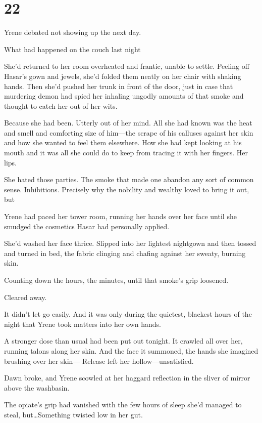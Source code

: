 
\chapter{22}

Yrene debated not showing up the next day.

What had happened on the couch last night 

She'd returned to her room overheated and frantic, unable to settle.
Peeling off Hasar's gown and jewels, she'd folded them neatly on her chair with shaking hands.
Then she'd pushed her trunk in front of the door, just in case that murdering demon had spied her inhaling ungodly amounts of that smoke and thought to catch her out of her wits.

Because she had been.
Utterly out of her mind.
All she had known was the heat and smell and comforting size of him---the scrape of his calluses against her skin and how she wanted to feel them elsewhere.
How she had kept looking at his mouth and it was all she could do to keep from tracing it with her fingers.
Her lips.

She hated those parties.
The smoke that made one abandon any sort of common sense.
Inhibitions.
Precisely why the nobility and wealthy loved to bring it out, but 

Yrene had paced her tower room, running her hands over her face until she smudged the cosmetics Hasar had personally applied.

She'd washed her face thrice.
Slipped into her lightest nightgown and then tossed and turned in bed, the fabric clinging and chafing against her sweaty, burning skin.

Counting down the hours, the minutes, until that smoke's grip loosened.

Cleared away.

It didn't let go easily.
And it was only during the quietest, blackest hours of the night that Yrene took matters into her own hands.

A stronger dose than usual had been put out tonight.
It crawled all over her, running talons along her skin.
And the face it summoned, the hands she imagined brushing over her skin--- Release left her hollow---unsatisfied.

Dawn broke, and Yrene scowled at her haggard reflection in the sliver of mirror above the washbasin.

The opiate's grip had vanished with the few hours of sleep she'd managed to steal, but\ldots Something twisted low in her gut.

